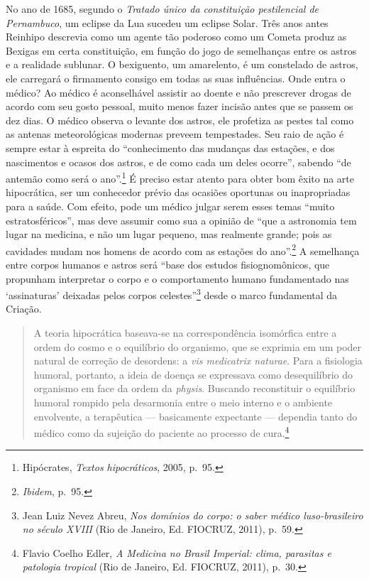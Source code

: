 No ano de 1685, segundo o \textit{Tratado único da constituição
pestilencial de Pernambuco}, um eclipse da Lua sucedeu um eclipse Solar.
Três anos antes Reinhipo descrevia como um agente tão poderoso como um
Cometa produz as Bexigas em certa constituição, em função do jogo de
semelhanças entre os astros e a realidade sublunar. O bexiguento, um
amarelento, é um constelado de astros, ele carregará o firmamento
consigo em todas as suas influências. Onde entra o médico? Ao médico é
aconselhável assistir ao doente e não prescrever drogas de acordo com
seu gosto pessoal, muito menos fazer incisão antes que se passem os dez
dias. O médico observa o levante dos astros, ele profetiza as pestes tal
como as antenas meteorológicas modernas preveem tempestades. Seu raio de
ação é sempre estar à espreita do ``conhecimento das mudanças das
estações, e dos nascimentos e ocasos dos astros, e de como cada um deles
ocorre'', sabendo ``de antemão como será o ano''.\footnote{Hipócrates,
  \textit{Textos hipocráticos}, 2005, p.~95.} É preciso estar atento para
obter bom êxito na arte hipocrática, ser um conhecedor prévio das
ocasiões oportunas ou inapropriadas para a saúde. Com efeito, pode um
médico julgar serem esses temas ``muito estratosféricos'', mas deve
assumir como sua a opinião de ``que a astronomia tem lugar na medicina,
e não um lugar pequeno, mas realmente grande; pois as cavidades mudam
nos homens de acordo com as estações do ano''.\footnote{\textit{Ibidem},
  p.~95.} A semelhança entre corpos humanos e astros será ``base dos
estudos fisiognomônicos, que propunham interpretar o corpo e o
comportamento humano fundamentado nas `assinaturas' deixadas pelos
corpos celestes''\footnote{Jean Luiz Nevez Abreu, \textit{Nos domínios do
  corpo: o saber médico luso-brasileiro no século XVIII} (Rio de
  Janeiro, Ed. FIOCRUZ, 2011), p.~59.} desde o marco fundamental da
Criação.

\begin{quote}
A teoria hipocrática baseava-se na correspondência isomórfica entre a
ordem do cosmo e o equilíbrio do organismo, que se exprimia em um poder
natural de correção de desordens: a \textit{vis medicatrix naturae}. Para
a fisiologia humoral, portanto, a ideia de doença se expressava como
desequilíbrio do organismo em face da ordem da \textit{physis}. Buscando
reconstituir o equilíbrio humoral rompido pela desarmonia entre o meio
interno e o ambiente envolvente, a terapêutica --- basicamente expectante
--- dependia tanto do médico como da sujeição do paciente ao processo de
cura.\footnote{Flavio Coelho Edler, \textit{A Medicina no Brasil Imperial:
  clima, parasitas e patologia tropical} (Rio de Janeiro, Ed. FIOCRUZ,
  2011), p.~30.}
\end{quote}

